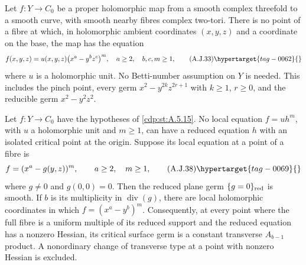 \begin{proposition}\hypertarget{tag-01B5}{}\label{cdp:st:A.5.15}


Let $f:Y\to C_0$ be a proper holomorphic map from a
smooth complex threefold to a smooth curve, with smooth
nearby fibres complex two-tori. There is no point of
a fibre at which, in holomorphic ambient coordinates
$(x,y,z)$ and a coordinate on the base, the map has
the equation
\[
 f(x,y,z)=u(x,y,z)\bigl(x^a-y^bz^c\bigr)^m,
 \quad a\ge2,\quad b,c,m\ge1,                                    \tag{A.J.33}\hypertarget{tag-0062}{}\label{cdp:eq:A.J.33}
\]
where $u$ is a holomorphic unit. No Betti-number
assumption on $Y$ is needed. This includes the pinch
point, every germ $x^2-y^{2k}z^{2r+1}$ with
$k\ge1$, $r\ge0$, and the reducible germ
$x^2-y^2z^2$.
\end{proposition}

\begin{proposition}\hypertarget{tag-01B7}{}\label{cdp:st:A.5.17}


Let $f:Y\to C_0$ have the hypotheses of \ref{cdp:st:A.5.15}.
No local equation $f=u h^m$, with $u$ a holomorphic
unit and $m\ge1$, can have a reduced equation $h$
with an isolated critical point at the origin.
Suppose its local equation at a point of a fibre is
\[
             f=(x^a-g(y,z))^m,
             \qquad a\ge2,\quad m\ge1,             \tag{A.J.38}\hypertarget{tag-0069}{}\label{cdp:eq:A.J.38}
\]
where $g\ne0$ and $g(0,0)=0$. Then the reduced
plane germ $\{g=0\}_{\rm red}$ is smooth. If
$b$ is its multiplicity in $\operatorname{div}(g)$,
there are local holomorphic coordinates in which
$f=(x^a-y^b)^m$.
Consequently, at every point where the full fibre
is a uniform multiple of its reduced support and
the reduced equation has a nonzero Hessian, its
critical surface germ is a constant
transverse $A_{b-1}$ product. A nonordinary change
of transverse type at a point with nonzero Hessian
is excluded.
\end{proposition}

